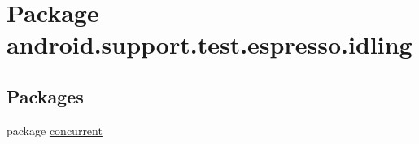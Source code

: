 \hypertarget{namespaceandroid_1_1support_1_1test_1_1espresso_1_1idling}{}\section{Package android.\+support.\+test.\+espresso.\+idling}
\label{namespaceandroid_1_1support_1_1test_1_1espresso_1_1idling}
\subsection*{Packages}
\begin{DoxyCompactItemize}
\item 
package \mbox{\hyperlink{namespaceandroid_1_1support_1_1test_1_1espresso_1_1idling_1_1concurrent}{concurrent}}
\end{DoxyCompactItemize}
